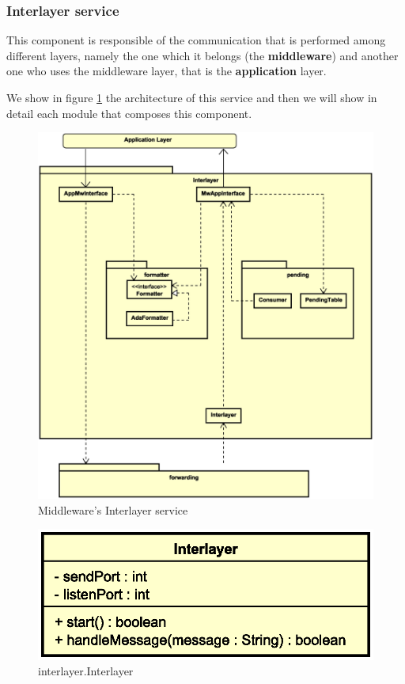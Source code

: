 \subsubsection{Interlayer service}

This component is responsible of the communication that is performed among
different layers, namely the one which it belongs (the \textbf{middleware}) and
another one who uses the middleware layer, that is the \textbf{application}
layer.

We show in figure \ref{fig:mw-interlayer} the architecture of this service and
then we will show in detail each module that composes this component.

\begin{figure}[H]
  \centering
  \includegraphics[width=\columnwidth]{images/solution/mw/interlayer.eps}
  \caption{Middleware's Interlayer service}
  \label{fig:mw-interlayer}
\end{figure}


\begin{figure}[H]
  \centering
  \includegraphics[width=.5\columnwidth]{images/solution/mw/int/inter.eps}
  \caption{interlayer.Interlayer}
  \label{fig:mw-interlayer-interlayer}
\end{figure}

